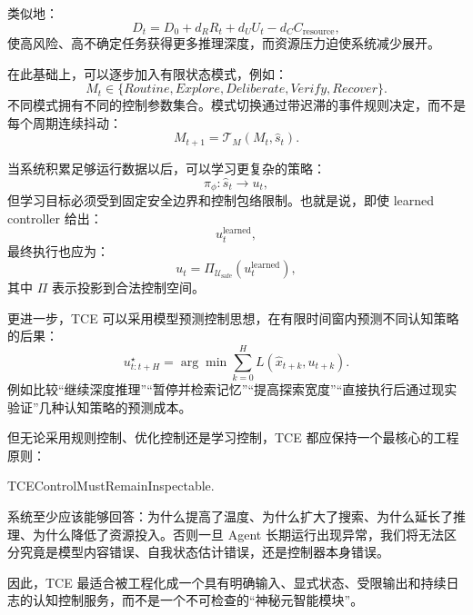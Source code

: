 类似地：
\begin{equation}
    D_t
    =
    D_0
    +
    d_RR_t
    +
    d_UU_t
    -
    d_CC_{\mathrm{resource}},
\end{equation}
使高风险、高不确定任务获得更多推理深度，而资源压力迫使系统减少展开。

在此基础上，可以逐步加入有限状态模式，例如：
\begin{equation}
    M_t
    \in
    \{
    Routine,
    Explore,
    Deliberate,
    Verify,
    Recover
    \}.
\end{equation}
不同模式拥有不同的控制参数集合。模式切换通过带迟滞的事件规则决定，而不是每个周期连续抖动：
\begin{equation}
    M_{t+1}
    =
    \mathcal T_M(M_t,\hat s_t).
\end{equation}

当系统积累足够运行数据以后，可以学习更复杂的策略：
\begin{equation}
    \pi_\phi:
    \hat s_t
    \rightarrow
    u_t,
\end{equation}
但学习目标必须受到固定安全边界和控制包络限制。也就是说，即使 learned controller 给出：
\begin{equation}
    u^\mathrm{learned}_t,
\end{equation}
最终执行也应为：
\begin{equation}
    u_t
    =
    \Pi_{\mathcal U_{\mathrm{safe}}}
    \left(
    u^\mathrm{learned}_t
    \right),
\end{equation}
其中 $\Pi$ 表示投影到合法控制空间。

更进一步，TCE 可以采用模型预测控制思想，在有限时间窗内预测不同认知策略的后果：
\begin{equation}
    u_{t:t+H}^\star
    =
    \arg\min
    \sum_{k=0}^{H}
    L(
    \hat x_{t+k},
    u_{t+k}
    ).
\end{equation}
例如比较“继续深度推理”“暂停并检索记忆”“提高探索宽度”“直接执行后通过现实验证”几种认知策略的预测成本。

但无论采用规则控制、优化控制还是学习控制，TCE 都应保持一个最核心的工程原则：
\begin{statementbox}
TCEControlMustRemainInspectable.
\end{statementbox}
系统至少应该能够回答：为什么提高了温度、为什么扩大了搜索、为什么延长了推理、为什么降低了资源投入。否则一旦 Agent 长期运行出现异常，我们将无法区分究竟是模型内容错误、自我状态估计错误，还是控制器本身错误。

因此，TCE 最适合被工程化成一个具有明确输入、显式状态、受限输出和持续日志的认知控制服务，而不是一个不可检查的“神秘元智能模块”。

